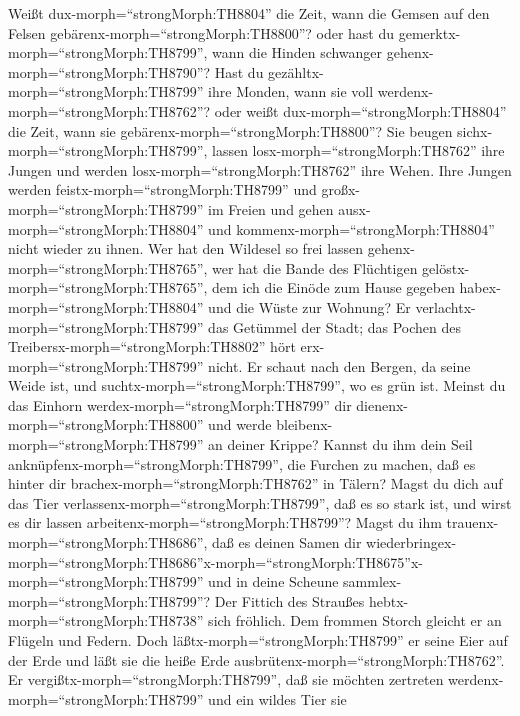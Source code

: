  Weißt dux-morph=``strongMorph:TH8804'' die Zeit, wann die
Gemsen auf den Felsen gebärenx-morph=``strongMorph:TH8800''? oder hast
du gemerktx-morph=``strongMorph:TH8799'', wann die Hinden schwanger
gehenx-morph=``strongMorph:TH8790''?  Hast du
gezähltx-morph=``strongMorph:TH8799'' ihre Monden, wann sie voll
werdenx-morph=``strongMorph:TH8762''? oder weißt
dux-morph=``strongMorph:TH8804'' die Zeit, wann sie
gebärenx-morph=``strongMorph:TH8800''?  Sie beugen
sichx-morph=``strongMorph:TH8799'', lassen
losx-morph=``strongMorph:TH8762'' ihre Jungen und werden
losx-morph=``strongMorph:TH8762'' ihre Wehen.  Ihre Jungen
werden feistx-morph=``strongMorph:TH8799'' und
großx-morph=``strongMorph:TH8799'' im Freien und gehen
ausx-morph=``strongMorph:TH8804'' und
kommenx-morph=``strongMorph:TH8804'' nicht wieder zu ihnen. 
Wer hat den Wildesel so frei lassen gehenx-morph=``strongMorph:TH8765'',
wer hat die Bande des Flüchtigen gelöstx-morph=``strongMorph:TH8765'',
 dem ich die Einöde zum Hause gegeben
habex-morph=``strongMorph:TH8804'' und die Wüste zur Wohnung?
 Er verlachtx-morph=``strongMorph:TH8799'' das Getümmel der
Stadt; das Pochen des Treibersx-morph=``strongMorph:TH8802'' hört
erx-morph=``strongMorph:TH8799'' nicht.  Er schaut nach den
Bergen, da seine Weide ist, und suchtx-morph=``strongMorph:TH8799'', wo
es grün ist.  Meinst du das Einhorn
werdex-morph=``strongMorph:TH8799'' dir
dienenx-morph=``strongMorph:TH8800'' und werde
bleibenx-morph=``strongMorph:TH8799'' an deiner Krippe? 
Kannst du ihm dein Seil anknüpfenx-morph=``strongMorph:TH8799'', die
Furchen zu machen, daß es hinter dir
brachex-morph=``strongMorph:TH8762'' in Tälern?  Magst du
dich auf das Tier verlassenx-morph=``strongMorph:TH8799'', daß es so
stark ist, und wirst es dir lassen
arbeitenx-morph=``strongMorph:TH8799''?  Magst du ihm
trauenx-morph=``strongMorph:TH8686'', daß es deinen Samen dir
wiederbringex-morph=``strongMorph:TH8686''\textbar x-morph=``strongMorph:TH8675''x-morph=``strongMorph:TH8799''
und in deine Scheune sammlex-morph=``strongMorph:TH8799''? 
Der Fittich des Straußes hebtx-morph=``strongMorph:TH8738'' sich
fröhlich. Dem frommen Storch gleicht er an Flügeln und Federn.
 Doch läßtx-morph=``strongMorph:TH8799'' er seine Eier auf
der Erde und läßt sie die heiße Erde
ausbrütenx-morph=``strongMorph:TH8762''.  Er
vergißtx-morph=``strongMorph:TH8799'', daß sie möchten zertreten
werdenx-morph=``strongMorph:TH8799'' und ein wildes Tier sie
